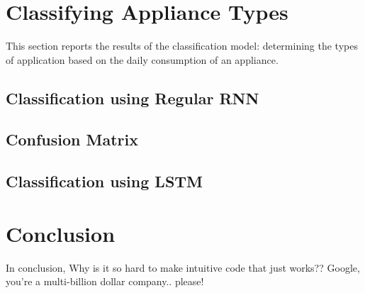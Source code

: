 \documentclass[a4paper, article, oneside, USenglish, IN5460]{memoir}
\begin{document}
\chapter{Classifying Appliance Types}

This section reports the results of the classification model: determining the types of application based on the daily consumption of an appliance.

\section{Classification using Regular RNN}


\section{Confusion Matrix}


\section{Classification using LSTM}


\chapter{Conclusion}

In conclusion, Why is it so hard to make intuitive code that just works?? Google, you're a multi-billion dollar company.. please! 
\newpage

\nocite{tensorflow2015-whitepaper}
\nocite{dataset}

\printbibliography{}

\vspace*{10mm}
\end{document}

